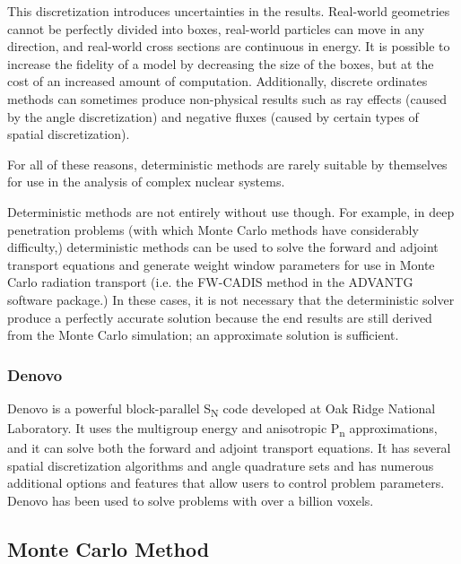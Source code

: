 This discretization introduces uncertainties in the results.
Real-world geometries cannot be perfectly divided into boxes, real-world particles can move in any direction, and real-world cross sections are continuous in energy.
It is possible to increase the fidelity of a model by decreasing the size of the boxes, but at the cost of an increased amount of computation.
Additionally, discrete ordinates methods can sometimes produce non-physical results such as ray effects (caused by the angle discretization) and negative fluxes (caused by certain types of spatial discretization).

For all of these reasons, deterministic methods are rarely suitable by themselves for use in the analysis of complex nuclear systems.

Deterministic methods are not entirely without use though.
For example, in deep penetration problems (with which Monte Carlo methods have considerably difficulty,) deterministic methods can be used to solve the forward and adjoint transport equations and generate weight window parameters for use in Monte Carlo radiation transport (i.e. the FW-CADIS method \cite{fwcadis} in the ADVANTG \cite{advantg} software package.)
In these cases, it is not necessary that the deterministic solver produce a perfectly accurate solution because the end results are still derived from the Monte Carlo simulation; an approximate solution is sufficient.

\subsubsection{Denovo}
\label{sec:bg:rt:determ:denovo}

Denovo \cite{denovo} is a powerful block-parallel S\textsubscript{N} code developed at Oak Ridge National Laboratory.
It uses the multigroup energy and anisotropic P\textsubscript{n} approximations, and it can solve both the forward and adjoint transport equations.
It has several spatial discretization algorithms and angle quadrature sets and has numerous additional options and features that allow users to control problem parameters.
Denovo has been used to solve problems with over a billion voxels.

\subsection{Monte Carlo Method}
\label{sec:bg:rt:mc}

